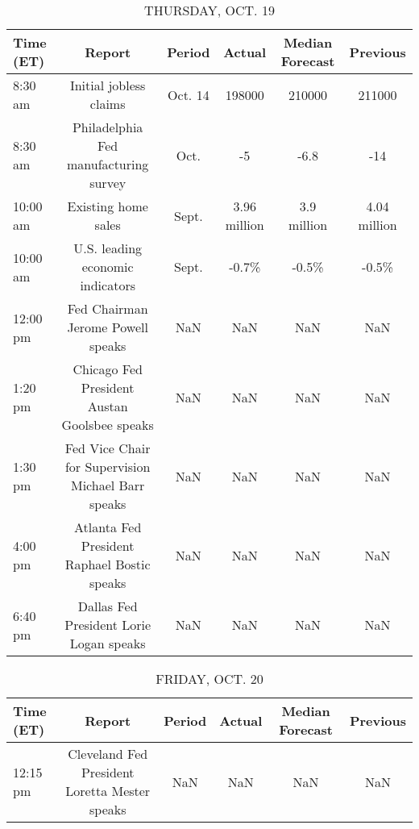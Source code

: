 \documentclass{article}%
\begin{document}
\begin{table}[htbp]%
\caption{THURSDAY, OCT. 19}%
\centering%
\begin{adjustbox}{width=1\textwidth}%
\begin{tabular}{lccccc}
\toprule
Time (ET) &                                             Report &  Period &       Actual & Median Forecast &     Previous \\
\midrule
  8:30 am &                             Initial jobless claims & Oct. 14 &       198000 &          210000 &       211000 \\
  8:30 am &              Philadelphia Fed manufacturing survey &    Oct. &           -5 &            -6.8 &          -14 \\
 10:00 am &                                Existing home sales &   Sept. & 3.96 million &     3.9 million & 4.04 million \\
 10:00 am &                   U.S. leading economic indicators &   Sept. &        -0.7\% &           -0.5\% &        -0.5\% \\
 12:00 pm &                  Fed Chairman Jerome Powell speaks &     NaN &          NaN &             NaN &          NaN \\
  1:20 pm &       Chicago Fed President Austan Goolsbee speaks &     NaN &          NaN &             NaN &          NaN \\
  1:30 pm & Fed Vice Chair for Supervision Michael Barr speaks &     NaN &          NaN &             NaN &          NaN \\
  4:00 pm &        Atlanta Fed President Raphael Bostic speaks &     NaN &          NaN &             NaN &          NaN \\
  6:40 pm &            Dallas Fed President Lorie Logan speaks &     NaN &          NaN &             NaN &          NaN \\
\bottomrule
\end{tabular}
%
\end{adjustbox}%
\end{table}

%


\begin{table}[htbp]%
\caption{FRIDAY, OCT. 20}%
\centering%
\begin{adjustbox}{width=1\textwidth}%
\begin{tabular}{lccccc}
\toprule
Time (ET) &                                        Report & Period & Actual & Median Forecast & Previous \\
\midrule
 12:15 pm & Cleveland Fed President Loretta Mester speaks &    NaN &    NaN &             NaN &      NaN \\
\bottomrule
\end{tabular}
%
\end{adjustbox}%
\end{table}
\end{document}
